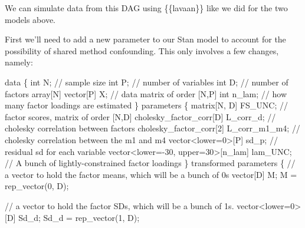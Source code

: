 \documentclass[
  letterpaper,
  DIV=11,
  numbers=noendperiod]{scrreprt}
\newenvironment{Shaded}{\begin{snugshade}}{\end{snugshade}}
\newcommand{\CommentTok}[1]{\textcolor[rgb]{0.37,0.37,0.37}{#1}}
\newcommand{\DataTypeTok}[1]{\textcolor[rgb]{0.68,0.00,0.00}{#1}}
\newcommand{\DecValTok}[1]{\textcolor[rgb]{0.68,0.00,0.00}{#1}}
\newcommand{\KeywordTok}[1]{\textcolor[rgb]{0.00,0.23,0.31}{#1}}
\newcommand{\NormalTok}[1]{\textcolor[rgb]{0.00,0.23,0.31}{#1}}
\begin{document}
We can simulate data from this DAG using \{\{lavaan\}\} like we did for
the two models above.

First we'll need to add a new parameter to our Stan model to account for
the possibility of shared method confounding. This only involves a few
changes, namely:

\begin{Shaded}
\begin{Highlighting}[]
\KeywordTok{data}\NormalTok{ \{}
  \DataTypeTok{int}\NormalTok{ N; }\CommentTok{// sample size}
  \DataTypeTok{int}\NormalTok{ P; }\CommentTok{// number of variables}
  \DataTypeTok{int}\NormalTok{ D; }\CommentTok{// number of factors}
  \DataTypeTok{array}\NormalTok{[N] }\DataTypeTok{vector}\NormalTok{[P] X; }\CommentTok{// data matrix of order [N,P]}
  \DataTypeTok{int}\NormalTok{ n\_lam; }\CommentTok{// how many factor loadings are estimated}
\NormalTok{\}}
\KeywordTok{parameters}\NormalTok{ \{}
  \DataTypeTok{matrix}\NormalTok{[N, D] FS\_UNC; }\CommentTok{// factor scores, matrix of order [N,D]}
  \DataTypeTok{cholesky\_factor\_corr}\NormalTok{[D] L\_corr\_d; }\CommentTok{// cholesky correlation between factors}
  \DataTypeTok{cholesky\_factor\_corr}\NormalTok{[}\DecValTok{2}\NormalTok{] L\_corr\_m1\_m4; }\CommentTok{// cholesky correlation between the m1 and m4}
  \DataTypeTok{vector}\NormalTok{\textless{}}\KeywordTok{lower}\NormalTok{=}\DecValTok{0}\NormalTok{\textgreater{}[P] sd\_p; }\CommentTok{// residual sd for each variable}
  \DataTypeTok{vector}\NormalTok{\textless{}}\KeywordTok{lower}\NormalTok{={-}}\DecValTok{30}\NormalTok{, }\KeywordTok{upper}\NormalTok{=}\DecValTok{30}\NormalTok{\textgreater{}[n\_lam] lam\_UNC; }\CommentTok{// A bunch of lightly{-}constrained factor loadings}
\NormalTok{\}}
\KeywordTok{transformed parameters}\NormalTok{ \{}
  \CommentTok{// a vector to hold the factor means, which will be a bunch of 0s}
  \DataTypeTok{vector}\NormalTok{[D] M;}
\NormalTok{  M = rep\_vector(}\DecValTok{0}\NormalTok{, D);}
  
  \CommentTok{// a vector to hold the factor SDs, which will be a bunch of 1s. }
  \DataTypeTok{vector}\NormalTok{\textless{}}\KeywordTok{lower}\NormalTok{=}\DecValTok{0}\NormalTok{\textgreater{}[D] Sd\_d;}
\NormalTok{  Sd\_d = rep\_vector(}\DecValTok{1}\NormalTok{, D);}
  

\end{Highlighting}
\end{Shaded}
\end{document}
